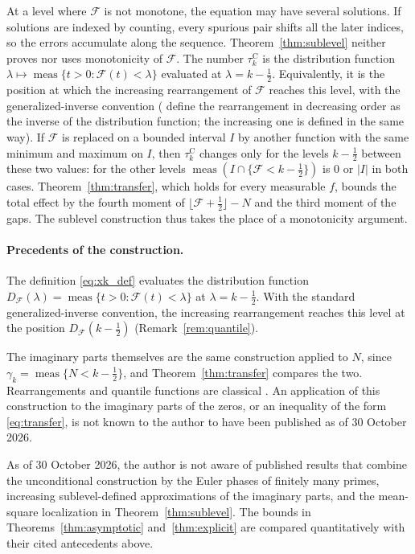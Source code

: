 \documentclass[11pt,a4paper]{article}
\makeatletter
\numberwithin{equation}{section}
\DeclareRobustCommand{\CGref}[1]{\ref{#1}}
\DeclareRobustCommand{\CGeqref}[1]{\eqref{#1}}
\DeclareRobustCommand{\CGcite}[2][]{\if\relax\detokenize{#1}\relax\cite{#2}\else\cite[#1]{#2}\fi}
\let\CG@origref\ref
\let\CG@origeqref\eqref
\newcommand{\CG@gettip}[1]{\@ifundefined{CGTip@#1}{#1}{\csname CGTip@#1\endcsname}}
\newcommand{\CG@getbib}[1]{\@ifundefined{CGBib@#1}{#1}{\csname CGBib@#1\endcsname}}
\DeclareRobustCommand{\CGref}[1]{\pdftooltip{\CG@origref{#1}}{\CG@gettip{#1}}}
\DeclareRobustCommand{\CGeqref}[1]{\pdftooltip{\CG@origeqref{#1}}{\CG@gettip{#1}}}
\DeclareRobustCommand{\CGcite}[2][]{\pdftooltip{\if\relax\detokenize{#1}\relax\cite{#2}\else\cite[#1]{#2}\fi}{\CG@getbib{#2}}}
\theoremstyle{definition}
\theoremstyle{remark}
\newcommand{\Fc}{\mathcal F}
\newcommand{\meas}{\operatorname{meas}}
\makeatother
\begin{document}
At a level where $\Fc$ is not monotone, the equation may have several solutions. If solutions are indexed by counting, every spurious pair shifts all the later indices, so the errors accumulate along the sequence. Theorem~\CGref{thm:sublevel} neither proves nor uses monotonicity of $\Fc$. The number $\tau_{k}^{\mathrm C}$ is the distribution function $\lambda\mapsto\meas\{t>0:\Fc(t)<\lambda\}$ evaluated at $\lambda=k-\frac12$. Equivalently, it is the position at which the increasing rearrangement of $\Fc$ reaches this level, with the generalized-inverse convention (\CGcite[\S10.12]{HardyLittlewoodPolya1934} define the rearrangement in decreasing order as the inverse of the distribution function; the increasing one is defined in the same way). If $\Fc$ is replaced on a bounded interval $I$ by another function with the same minimum and maximum on $I$, then $\tau_{k}^{\mathrm C}$ changes only for the levels $k-\frac12$ between these two values: for the other levels $\meas(I\cap\{\Fc<k-\frac12\})$ is $0$ or $|I|$ in both cases. Theorem~\CGref{thm:transfer}, which holds for every measurable $f$, bounds the total effect by the fourth moment of $\lfloor\Fc+\frac12\rfloor-N$ and the third moment of the gaps. The sublevel construction thus takes the place of a monotonicity argument.

\paragraph{Precedents of the construction.}
The definition \CGeqref{eq:xk_def} evaluates the distribution function $D_{\Fc}(\lambda)=\meas\{t>0:\Fc(t)<\lambda\}$ at $\lambda=k-\frac12$. With the standard generalized-inverse convention, the increasing rearrangement reaches this level at the position $D_{\Fc}(k-\frac12)$ (Remark~\CGref{rem:quantile}).

The imaginary parts themselves are the same construction applied to $N$, since $\gamma_k=\meas\{N<k-\frac12\}$, and Theorem~\CGref{thm:transfer} compares the two. Rearrangements and quantile functions are classical \CGcite[Ch.~X]{HardyLittlewoodPolya1934}. An application of this construction to the imaginary parts of the zeros, or an inequality of the form \CGeqref{eq:transfer}, is not known to the author to have been published as of 30 October 2026.

As of 30 October 2026, the author is not aware of published results that combine the unconditional construction by the Euler phases of finitely many primes, increasing sublevel-defined approximations of the imaginary parts, and the mean-square localization in Theorem~\CGref{thm:sublevel}. The bounds in Theorems~\CGref{thm:asymptotic} and~\CGref{thm:explicit} are compared quantitatively with their cited antecedents above.
\end{document}
